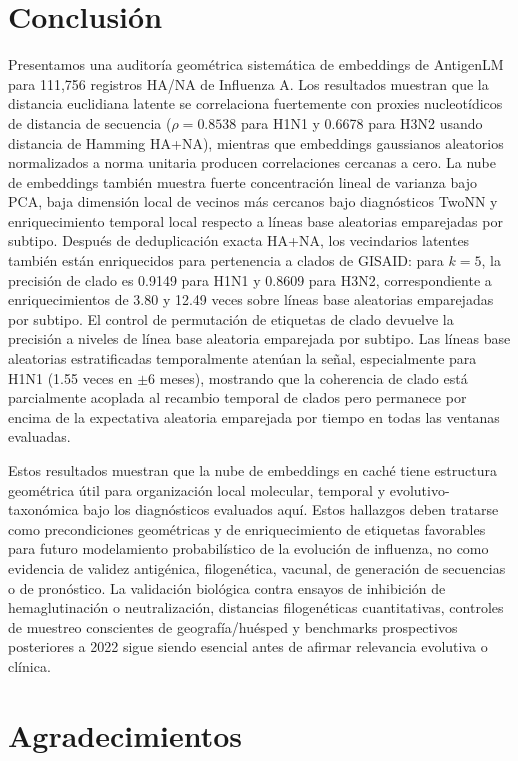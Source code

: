 \documentclass[11pt]{article}
\begin{document}
\section{Conclusión}

Presentamos una auditoría geométrica sistemática de embeddings de AntigenLM para 111,756 registros HA/NA de Influenza A. Los resultados muestran que la distancia euclidiana latente se correlaciona fuertemente con proxies nucleotídicos de distancia de secuencia ($\rho=0.8538$ para H1N1 y 0.6678 para H3N2 usando distancia de Hamming HA+NA), mientras que embeddings gaussianos aleatorios normalizados a norma unitaria producen correlaciones cercanas a cero. La nube de embeddings también muestra fuerte concentración lineal de varianza bajo PCA, baja dimensión local de vecinos más cercanos bajo diagnósticos TwoNN y enriquecimiento temporal local respecto a líneas base aleatorias emparejadas por subtipo. Después de deduplicación exacta HA+NA, los vecindarios latentes también están enriquecidos para pertenencia a clados de GISAID: para $k=5$, la precisión de clado es 0.9149 para H1N1 y 0.8609 para H3N2, correspondiente a enriquecimientos de 3.80 y 12.49 veces sobre líneas base aleatorias emparejadas por subtipo. El control de permutación de etiquetas de clado devuelve la precisión a niveles de línea base aleatoria emparejada por subtipo. Las líneas base aleatorias estratificadas temporalmente atenúan la señal, especialmente para H1N1 (1.55 veces en $\pm 6$ meses), mostrando que la coherencia de clado está parcialmente acoplada al recambio temporal de clados pero permanece por encima de la expectativa aleatoria emparejada por tiempo en todas las ventanas evaluadas.

Estos resultados muestran que la nube de embeddings en caché tiene estructura geométrica útil para organización local molecular, temporal y evolutivo-taxonómica bajo los diagnósticos evaluados aquí. Estos hallazgos deben tratarse como precondiciones geométricas y de enriquecimiento de etiquetas favorables para futuro modelamiento probabilístico de la evolución de influenza, no como evidencia de validez antigénica, filogenética, vacunal, de generación de secuencias o de pronóstico. La validación biológica contra ensayos de inhibición de hemaglutinación o neutralización, distancias filogenéticas cuantitativas, controles de muestreo conscientes de geografía/huésped y benchmarks prospectivos posteriores a 2022 sigue siendo esencial antes de afirmar relevancia evolutiva o clínica.

\section*{Agradecimientos}
\end{document}
